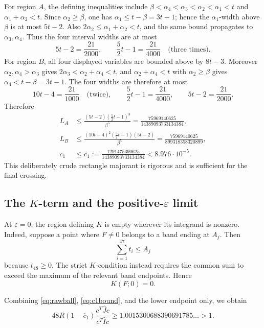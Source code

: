 \documentclass[11pt]{article}
\theoremstyle{definition}
\theoremstyle{remark}
\newcommand{\eps}{\varepsilon}
\begin{document}
For region \(A\), the defining inequalities include
\(\beta<\alpha_4<\alpha_3<\alpha_2<\alpha_1<t\) and
\(\alpha_1+\alpha_2<t\).  Since \(\alpha_2\geq\beta\), one has
\(\alpha_1\leq t-\beta=3t-1\); hence the \(\alpha_1\)-width above
\(\beta\) is at most \(5t-2\).  Also
\(2\alpha_2\leq\alpha_1+\alpha_2<t\), and the same bound propagates
to \(\alpha_3,\alpha_4\).  Thus the four interval widths are at most
\[
 5t-2=\frac{21}{2000},\qquad
 \frac52t-1=\frac{21}{4000}
 \quad\text{(three times)}.
\]
For region \(B\), all four displayed variables are bounded above by
\(8t-3\).  Moreover \(\alpha_2,\alpha_4>\alpha_3\) gives
\(2\alpha_3<\alpha_2+\alpha_4<t\), and
\(\alpha_2+\alpha_4<t\) with \(\alpha_2\geq\beta\) gives
\(\alpha_4<t-\beta=3t-1\).  The four widths are therefore at most
\[
 10t-4=\frac{21}{1000}\quad\text{(twice)},\qquad
 \frac52t-1=\frac{21}{4000},\qquad
 5t-2=\frac{21}{2000}.
\]
Therefore
\begin{align}
 L_A&\leq
 \frac{(5t-2)(\frac52t-1)^3}{\beta^5}
 =\frac{75969140625}{14389093733134384},\nonumber\\
 L_B&\leq
 \frac{(10t-4)^2(\frac52t-1)(5t-2)}{\beta^5}
 =\frac{75969140625}{899318358320899},\nonumber\\
 c_1&\leq\overline c_1:=
 \frac{1291475390625}{14389093733134384}
 <8.976\cdot10^{-5}.
\label{eq:c1bound}
\end{align}
This deliberately crude rectangle majorant is rigorous and is sufficient for
the final crossing.

\subsection{The \(K\)-term and the positive-\(\eps\) limit}
\label{sec:Klimit}

At \(\eps=0\), the region defining \(K\) is empty wherever its integrand is
nonzero.  Indeed, suppose a point where \(F\neq0\) belongs to a band ending at
\(A_j\).  Then
\[
 \sum_{i=1}^{47}t_i\leq A_j
\]
because \(t_{48}\geq0\).  The strict \(K\)-condition instead requires the
common sum to exceed the maximum of the relevant band endpoints.  Hence
\begin{equation}
\label{eq:Kzero}
 K(F;0)=0.
\end{equation}

Combining \eqref{eq:rawball}, \eqref{eq:c1bound}, and the lower endpoint only,
we obtain
\begin{equation}
\label{eq:adjusted}
 48R(1-\overline c_1)
 \frac{c^{\!T}\widehat Jc}{c^{\!T}\widehat Ic}
 \geq1.0015300688390691785\ldots>1.
\end{equation}
\end{document}
